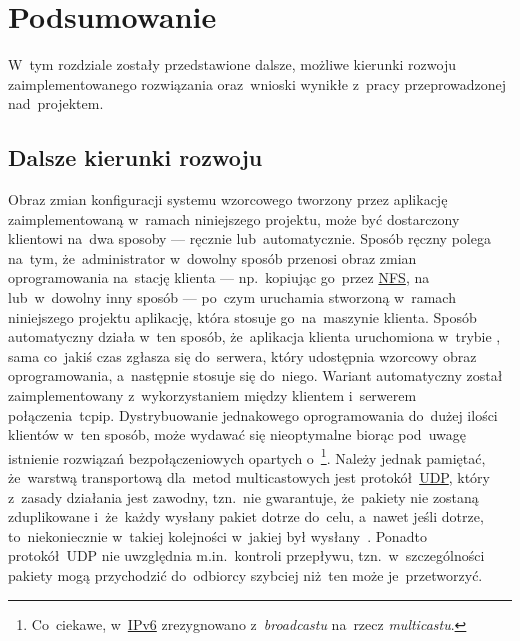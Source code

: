 \documentclass[thesis]{subfiles}
\begin{document}
\chapter{Podsumowanie}

W~tym rozdziale zostały przedstawione dalsze, możliwe kierunki rozwoju zaimplementowanego rozwiązania oraz~wnioski wynikłe z~pracy przeprowadzonej nad~projektem.

\section{Dalsze kierunki rozwoju}

Obraz zmian konfiguracji systemu wzorcowego tworzony przez aplikację zaimplementowaną w~ramach niniejszego projektu, może być dostarczony klientowi na~dwa sposoby --- ręcznie lub~automatycznie. Sposób ręczny polega na~tym, że~administrator w~dowolny sposób przenosi obraz zmian oprogramowania na~stację klienta --- np.~kopiując go~przez \href{https://en.wikipedia.org/wiki/Network_File_System}{NFS}, na~ lub~w~dowolny inny sposób --- po~czym uruchamia stworzoną w~ramach niniejszego projektu aplikację, która stosuje go~na~maszynie klienta. Sposób automatyczny działa w~ten sposób, że~aplikacja klienta uruchomiona w~trybie , sama co~jakiś czas zgłasza się do~serwera, który udostępnia wzorcowy obraz oprogramowania, a~następnie stosuje się do~niego. Wariant automatyczny został zaimplementowany z~wykorzystaniem między klientem i~serwerem połączenia~\gls{tcpip}. Dystrybuowanie jednakowego oprogramowania do~dużej ilości klientów w~ten sposób, może wydawać się nieoptymalne biorąc pod~uwagę istnienie rozwiązań bezpołączeniowych opartych o~\footnote{Co~ciekawe, w~\href{https://en.wikipedia.org/wiki/IPv6}{IPv6} zrezygnowano z~\emph{broadcastu} na~rzecz \emph{multicastu}.}. Należy jednak pamiętać, że~warstwą transportową dla~metod multicastowych jest protokół~\href{https://en.wikipedia.org/wiki/User_Datagram_Protocol}{UDP}, który z~zasady działania jest zawodny, tzn.~nie gwarantuje, że~pakiety nie zostaną zduplikowane i~że~każdy wysłany pakiet dotrze do~celu, a~nawet jeśli dotrze, to~niekoniecznie w~takiej kolejności w~jakiej był wysłany~\cite{rfc1112}. Ponadto protokół~UDP nie uwzględnia m.in.~kontroli przepływu, tzn.~w~szczególności pakiety mogą przychodzić do~odbiorcy szybciej niż~ten może je~przetworzyć.
\end{document}
